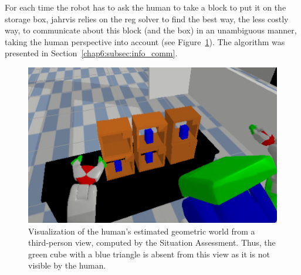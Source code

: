 \documentclass[a4paper,11pt,twoside]{StyleThese}
\begin{document}
For each time the robot has to ask the human to take a block to put it on the storage box, \acrshort{jahrvis} relies on the \acrshort{reg} solver to find the best way, \ie the less costly way, to communicate about this block (and the box) in an unambiguous manner, taking the human perspective into account (see Figure~\ref{chap9:fig:h_view}). The algorithm was presented in Section~\ref{chap6:subsec:info_comm}.

\begin{figure}[!hbt]
	\centering
	\includegraphics[scale=0.5]{figures/chapter4/robot_view.png}
	\caption{\label{chap9:fig:h_view} Visualization of the human's estimated geometric world from a third-person view, computed by the Situation Assessment. Thus, the green cube with a blue triangle is absent from this view as it is not visible by the human.}
\end{figure}
\end{document}
